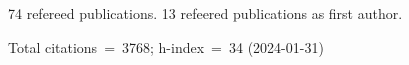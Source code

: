 74 refereed publications. 13 refeered publications as first author.

Total citations~=~3768; h-index~=~34 (2024-01-31)